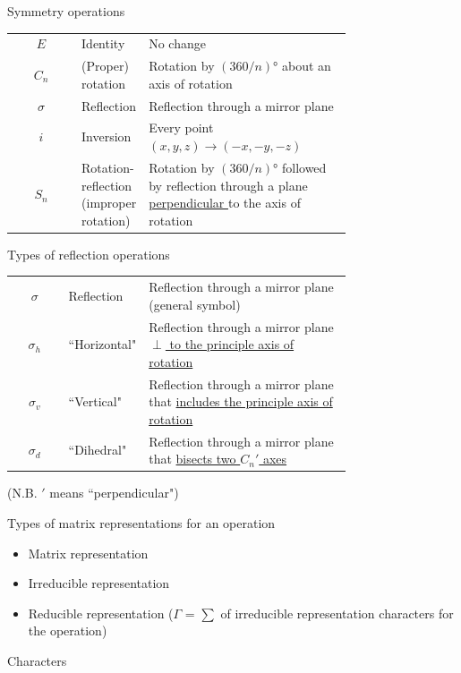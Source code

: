 \documentclass[10pt,landscape]{article}
\newcommand{\tableindent}{\hspace{1.5em}}
\begin{document}
\begin{multicols}{3}
Symmetry operations
%
\renewcommand{\arraystretch}{1.4}
\begin{tabular}{@{\tableindent}cp{0.15\linewidth}<{\raggedright}p{0.6\linewidth}<{\raggedright}@{}}
	$E$ & Identity & No change \\
	$C_n$ & (Proper) rotation  & Rotation by $(360/n)$° about an axis of rotation \\
	$\sigma$ & Reflection  & Reflection through a mirror plane \\
	$i$ & Inversion  & Every point $(x, y, z) \rightarrow (-x, -y, -z)$ \\ %
	$S_n$ & Rotation-reflection (improper rotation)  & Rotation by $(360/n)$° followed by reflection through a plane \underline{perpendicular }to the axis of rotation
\end{tabular}
\renewcommand{\arraystretch}{1}

Types of reflection operations
%
\renewcommand{\arraystretch}{1.4}
\begin{tabular}{@{\tableindent}cp{0.15\linewidth}<{\raggedright}p{0.6\linewidth}<{\raggedright}@{}}
	$\sigma$ & Reflection & Reflection through a mirror plane (general symbol) \\
	$\sigma_h$ & ``Horizontal"  & Reflection through a mirror plane \underline{$\perp$ to the principle axis of rotation} \\
	$\sigma_v$ & ``Vertical" & Reflection through a mirror plane that \underline{includes the principle axis of rotation} \\
	$\sigma_d$ & ``Dihedral" & Reflection through a mirror plane that \underline{bisects two $C_n'$ axes} \\
\end{tabular}
\renewcommand{\arraystretch}{1}

\tableindent (N.B. $'$ means ``perpendicular")

Types of matrix representations for an operation
\begin{itemize}
	\item Matrix representation
	\item Irreducible representation
	\item Reducible representation ($\Gamma$ = $\sum$ of irreducible representation characters for the operation)
\end{itemize}

Characters 


\end{multicols}
\end{document}
